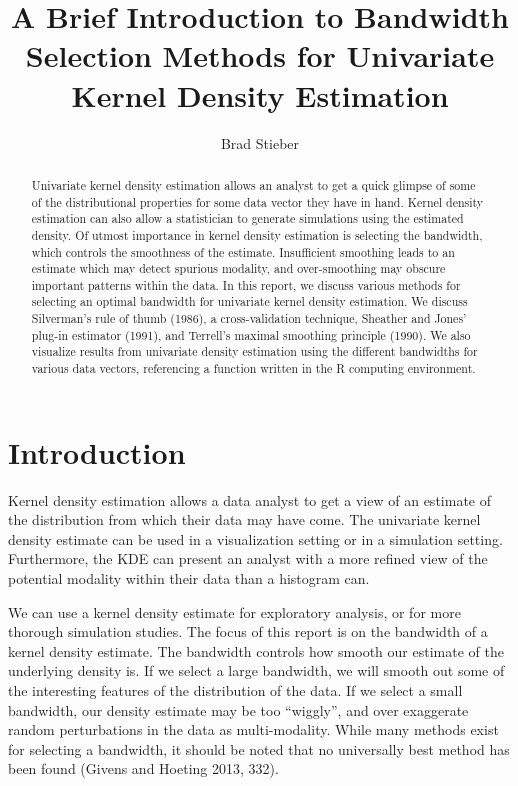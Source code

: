 \documentclass[]{article}
\title{A Brief Introduction to Bandwidth Selection Methods for Univariate
Kernel Density Estimation}
\author{Brad Stieber}
\date{}
\begin{document}
\maketitle
\begin{abstract}
Univariate kernel density estimation allows an analyst to get a quick
glimpse of some of the distributional properties for some data vector
they have in hand. Kernel density estimation can also allow a
statistician to generate simulations using the estimated density. Of
utmost importance in kernel density estimation is selecting the
bandwidth, which controls the smoothness of the estimate. Insufficient
smoothing leads to an estimate which may detect spurious modality, and
over-smoothing may obscure important patterns within the data. In this
report, we discuss various methods for selecting an optimal bandwidth
for univariate kernel density estimation. We discuss Silverman's rule of
thumb (1986), a cross-validation technique, Sheather and Jones' plug-in
estimator (1991), and Terrell's maximal smoothing principle (1990). We
also visualize results from univariate density estimation using the
different bandwidths for various data vectors, referencing a function
written in the R computing environment.
\end{abstract}

\section{Introduction}\label{introduction}

Kernel density estimation allows a data analyst to get a view of an
estimate of the distribution from which their data may have come. The
univariate kernel density estimate can be used in a visualization
setting or in a simulation setting. Furthermore, the KDE can present an
analyst with a more refined view of the potential modality within their
data than a histogram can.

We can use a kernel density estimate for exploratory analysis, or for
more thorough simulation studies. The focus of this report is on the
bandwidth of a kernel density estimate. The bandwidth controls how
smooth our estimate of the underlying density is. If we select a large
bandwidth, we will smooth out some of the interesting features of the
distribution of the data. If we select a small bandwidth, our density
estimate may be too ``wiggly'', and over exaggerate random perturbations
in the data as multi-modality. While many methods exist for selecting a
bandwidth, it should be noted that no universally best method has been
found (Givens and Hoeting 2013, 332).
\end{document}
